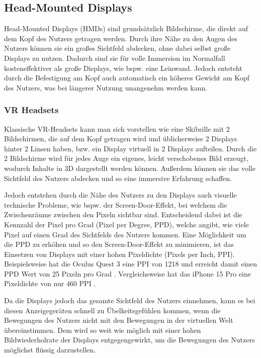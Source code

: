   \subsection{Head-Mounted Displays}
    Head-Mounted Displays (HMDs) sind grundsätzlich Bildschirme, die direkt auf dem Kopf des Nutzers getragen werden.
    Durch ihre Nähe zu den Augen des Nutzers können sie ein großes Sichtfeld abdecken, ohne dabei selbst große Displays zu nutzen.
    Dadurch sind sie für volle Immersion im Normalfall kosteneffektiver als große Displays, wie bspw. eine Leinwand.
    Jedoch entsteht durch die Befestigung am Kopf auch automatisch ein höheres Gewicht am Kopf des Nutzers, was bei längerer Nutzung unangenehm werden kann.


    \subsubsection{VR Headsets}

    Klassische VR-Headsets kann man sich vorstellen wie eine Skibrille mit 2 Bildschirmen, die auf dem Kopf getragen wird und üblicherweise 2 Displays hinter 2 Linsen haben, bzw. ein Display virtuell in 2 Displays aufteilen.
    Durch die 2 Bildschirme wird für jedes Auge ein eigenes, leicht verschobenes Bild erzeugt, wodurch Inhalte in 3D dargestellt werden können.
    Außerdem können sie das volle Sichtfeld des Nutzers abdecken und so eine immersive Erfahrung schaffen.

    Jedoch entstehen durch die Nähe des Nutzers zu den Displays auch visuelle technische Probleme, wie bspw. der Screen-Door-Effekt, bei welchem die Zwischenräume zwischen den Pixeln sichtbar sind.
    Entscheidend dabei ist die Kennzahl der Pixel pro Grad (Pixel per Degree, PPD), welche angibt, wie viele Pixel auf einen Grad des Sichtfelds des Nutzers kommen.
    Eine Möglichkeit um die PPD zu erhöhen und so den Screen-Door-Effekt zu minimieren, ist das Einsetzen von Displays mit einer hohen Pixeldichte (Pixels per Inch, PPI).
    Beispielsweise hat die Oculus Quest 3 eine PPI von 1218 und erreicht damit einen PPD Wert von 25 Pixeln pro Grad \autocite[]{meta-quest-3}.
    Vergleichsweise hat das iPhone 15 Pro eine Pixeldichte von nur 460 PPI \autocite[]{iPhone15Pro-datenblatt}.

    Da die Displays jedoch das gesamte Sichtfeld des Nutzers einnehmen, kann es bei diesen Anzeigegeräten schnell zu Übelkeitsgefühlen kommen, wenn die Bewegungen des Nutzers nicht mit den Bewegungen in der virtuellen Welt übereinstimmen.
    Dem wird so weit wie möglich mit einer hohen Bildwiederholrate der Displays entgegengewirkt, um die Bewegungen des Nutzers möglichst flüssig darzustellen.

